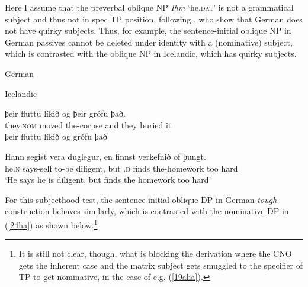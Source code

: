 \documentclass[output=paper,colorlinks,citecolor=brown,
]{langscibook}
\begin{document}
Here I assume that the preverbal oblique NP \textit{Ihm} ‘he.\textsc{dat}’ is not a grammatical subject and thus not in spec TP position, following \citet{ZaenenThrainsson1985}, who show that German does not have quirky subjects. Thus, for example, the sentence-initial oblique NP in German passives cannot be deleted under identity with a (nominative) subject, which is contrasted with the oblique NP in Icelandic, which has quirky subjects.

\begin{exe}
\ex \label{21ha}German
\begin{xlist}



\end{xlist}

\ex \label{22ha}Icelandic
\begin{xlist}
\ex \label{22aha}
\gll ϸeir  fluttu  líkið og   ϸeir grófu   ϸað.\\
they.\textsc{nom} moved the-corpse and they buried it\\

\ex \label{22bha}
ϸeir fluttu líkið og \underline{\hspace{6mm}} grófu ϸað 

\ex \label{22cha}
\gll Hann segist vera duglegur, en \underline{\hspace{6mm}} finnst  verkefnið of ϸungt.\\
he.\textsc{n} says-self to-be diligent, but \underline{\hspace{6mm}}.\textsc{d} finds the-homework too hard\\
\glt `He says he is diligent, but finds the homework too hard' \citep[453-454]{ZaenenThráinsson1985}
\end{xlist}

\end{exe}
For this subjecthood test, the sentence-initial oblique DP in German \textit{tough} construction behaves similarly, which is contrasted with the nominative DP in (\ref{24ha}) as shown below.\footnote{It is still not clear, though, what is blocking the derivation where the CNO gets the inherent case and the matrix subject gets smuggled to the specifier of TP to get nominative, in the case of e.g. (\ref{19aha}).}
\end{document}

